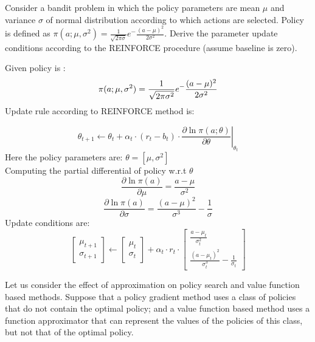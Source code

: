 \documentclass[solution,addpoints,12pt]{exam}
\begin{document}
\begin{questions}
\question[3]
Consider a bandit problem in which the policy parameters are mean $ \mu$ and variance $\sigma$ of normal distribution according to which actions are selected. Policy is defined as $ \pi(a;\mu,\sigma^2) = \frac{1}{\sqrt{2\pi\sigma}}e^-\frac{(a-\mu)^2}{2\sigma^2}$. Derive the parameter update conditions according to the REINFORCE procedure (assume baseline is zero).

\begin{solution}
Given policy is :
\begin{equation}
     \pi(a;\mu,\sigma^2) = \frac{1}{\sqrt{2\pi\sigma^2}}e^-\frac{(a-\mu)^2}{2\sigma^2}\notag
\end{equation} 
Update rule according to REINFORCE method is:

\begin{equation}
\theta_{t+1} \xleftarrow{} \theta_{t} + \alpha_{t} \cdot (r_{t} - b_{t}) \cdot \left.\frac{\partial \ln{\pi(a; \theta)}}{\partial \theta}\right\vert_{\theta_{t}}
\end{equation}
Here the policy parameters are: $\theta = [\mu, \sigma^2]$ \\
Computing the partial differential of policy w.r.t $\theta$
\begin{equation}
    \frac{\partial \ln{\pi(a)}}{\partial \mu} = \frac{a - \mu}{\sigma^2}
\end{equation}
\begin{equation}
    \frac{\partial \ln{\pi(a)}}{\partial \sigma} = \frac{(a - \mu)^2}{\sigma^3} - \frac{1}{\sigma}
\end{equation}
Update conditions are:
\begin{equation}
    \begin{bmatrix}
    \mu_{t+1} \\
    \sigma_{t+1}
    \end{bmatrix}
    \xleftarrow{}
    \begin{bmatrix}
    \mu_{t} \\
    \sigma_{t}
    \end{bmatrix}
    + \alpha_{t} \cdot r_{t} \cdot
    \begin{bmatrix}
       \frac{a - \mu_{t}}{\sigma_{t}^2} \\
      \frac{(a - \mu_{t})^2}{\sigma_{t}^3} - \frac{1}{\sigma_{t}}
    \end{bmatrix}
\end{equation}
\end{solution}
\question[6]
 Let us consider the effect of approximation on policy search and value function based methods. Suppose that a policy gradient method uses a class of policies that do not contain the optimal policy; and a value function based method uses a function approximator that can represent the values of the policies of this class, but not that of the optimal policy.

\end{questions}
\end{document}
